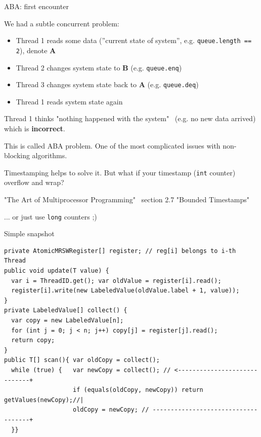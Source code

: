 \begin{frame}[fragile]{ABA: first encounter}

We had a subtle concurrent problem:
\begin{itemize}
 \item Thread 1 reads some data (''current state of system'', e.g. \texttt{queue.length == 2}), denote \textbf{A}
 \item Thread 2 changes system state to \textbf{B} (e.g. \texttt{queue.enq})
 \item Thread 3 changes system state back to \textbf{A} (e.g. \texttt{queue.deq})
 \item Thread 1 reads system state again
\end{itemize}

\pause

Thread 1 thinks "nothing happened with the system" \ (e.g. no new data arrived) which is \textbf{incorrect}.

\pause

This is called ABA problem. One of the most complicated issues with non-blocking algorithms.

\pause

Timestamping helps to solve it. \pause But what if your timestamp (\texttt{int} counter) overflow and wrap? 

\pause
"The Art of Multiprocessor Programming" \ section 2.7 "Bounded Timestamps" \pause

... or just use \texttt{long} counters ;)

\end{frame}


\begin{frame}[fragile]{Simple snapshot}

\begin{verbatim}
private AtomicMRSWRegister[] register; // reg[i] belongs to i-th Thread
public void update(T value) {
  var i = ThreadID.get(); var oldValue = register[i].read();  
  register[i].write(new LabeledValue(oldValue.label + 1, value)); 
}
private LabeledValue[] collect() {
  var copy = new LabeledValue[n];
  for (int j = 0; j < n; j++) copy[j] = register[j].read();
  return copy; 
}
public T[] scan(){ var oldCopy = collect();
  while (true) {   var newCopy = collect(); // <-----------------------------+
                   if (equals(oldCopy, newCopy)) return getValues(newCopy);//|
                   oldCopy = newCopy; // ------------------------------------+    
  }}
\end{verbatim}
\end{frame}


